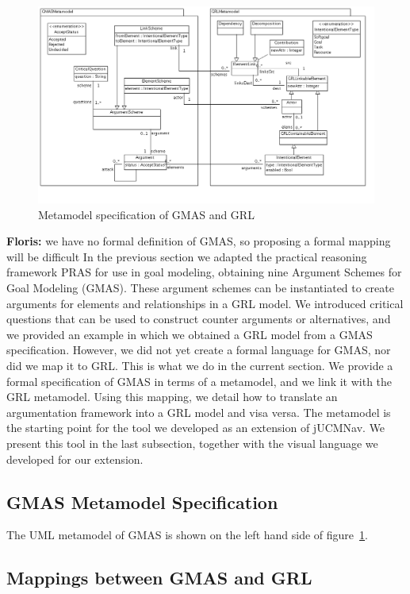 \documentclass[11.5pt,two column]{llncs}
\newcommand{\floris}[1]{{\color{red}\textbf{Floris: }#1}}
\begin{document}
\begin{figure}[h]
\includegraphics[scale=0.45]{img/ClassDiagram}
\caption{Metamodel specification of GMAS and GRL}
\label{fig:metamodel}
\end{figure}
\floris{we have no formal definition of GMAS, so proposing a formal mapping will be difficult}
In the previous section we adapted the practical reasoning framework PRAS for use in goal modeling, obtaining nine Argument Schemes for Goal Modeling (GMAS). These argument schemes can be instantiated to create arguments for elements and relationships in a GRL model. We introduced critical questions that can be used to construct counter arguments or alternatives, and we provided an example in which we obtained a GRL model from a GMAS specification. However, we did not yet create a formal language for GMAS, nor did we map it to GRL. This is what we do in the current section. We provide a formal specification of GMAS in terms of a metamodel, and we link it with the GRL metamodel. Using this mapping, we detail how to translate an argumentation framework into a GRL model and visa versa. The metamodel is the starting point for the tool we developed as an extension of jUCMNav. We present this tool in the last subsection, together with the visual language we developed for our extension.

\subsection{GMAS Metamodel Specification}
\label{sect:implementation:metamodel}

The UML metamodel of GMAS is shown on the left hand side of figure~\ref{fig:metamodel}.


\subsection{Mappings between GMAS and GRL}
\label{sect:implementation:mappings}
\end{document}
